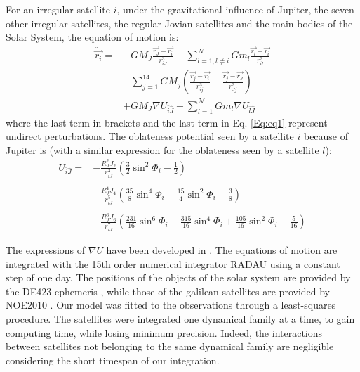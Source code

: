 \documentclass[useAMS,usenatbib]{mn2e}
\begin{document}
For an irregular satellite $i$, under the gravitational influence of Jupiter, the seven other irregular satellites, the regular Jovian satellites and the main bodies of the Solar System, the equation of motion is:
\begin{equation}
\label{Eq:eq1}
\begin{array}{ll}

\ddot{\vec{r_i}}= & \displaystyle -GM_J\frac{\vec{r_J}-\vec{r_i}}{r_{iJ}^3}-\sum_{l=1,l\neq i}^\mathcal{N} Gm_l\frac{\vec{r_l}-\vec{r_i}}{r_{il}^3}\\
&\displaystyle -\sum_{j=1}^{14}GM_j \left(\frac{\vec{r_j}-\vec{r_i}}{r_{ij}^3} - \frac{\vec{r_j}-\vec{r_J}}{r_{Jj}^3} \right)\\
 & \displaystyle +GM_J \nabla U_{\bar{i}\hat{J}} -\sum_{l=1}^\mathcal{N} Gm_l\nabla U_{\bar{l}\hat{J}}
\end{array}
\end{equation}
where the last term in brackets and the last term in Eq. \ref{Eq:eq1} represent undirect perturbations. The oblateness potential seen by a satellite $i$ because of Jupiter is (with a similar expression for the oblateness seen by a satellite $l$):
\begin{equation}\begin{array}{ll}

U_{\bar{i}\hat{J}}=&\displaystyle -\frac{R_J^2 J_2}{r_{iJ}^3}\left(\frac{3}{2}\sin^2 \Phi_i-\frac{1}{2}\right)\\ &\\ &
\displaystyle-\frac{R_J^4 J_4}{r_{iJ}^5}\left(\frac{35}{8}\sin^4 \Phi_i-\frac{15}{4}\sin^2 \Phi_i+\frac{3}{8}\right)\\
& \\
&\displaystyle-\frac{R_J^6 J_6}{r_{iJ}^7}\left(\frac{231}{16}\sin^6 \Phi_i-\frac{315}{16}\sin^4 \Phi_i+\frac{105}{16}\sin^2 \Phi_i-\frac{5}{16}\right)

\end{array}
\end{equation}

The expressions of $\nabla U$ have been developed in \cite{Lainey2004}. The equations of motion are integrated with the 15th order numerical integrator RADAU \citep{Everhart1985} using a constant step of one day. The positions of the objects of the solar system are provided by the DE423 ephemeris \citep{Folkner2010}, while those of the galilean satellites are provided by NOE2010 \citep{Lainey2004}.
Our model was fitted to the observations through a least-squares procedure. The satellites were integrated one dynamical family at a time, to gain computing time, while losing minimum precision. Indeed, the interactions between satellites not belonging to the same dynamical family are negligible considering the short timespan of our integration. 
\end{document}
